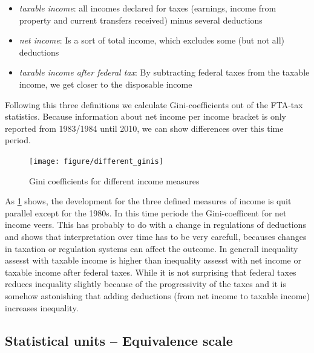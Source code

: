 \documentclass[twoside]{article}\usepackage[]{graphicx}\usepackage[]{color}
\newenvironment{knitrout}{}{} %
\begin{document}
\begin{multicols}{2}
\begin{itemize}
  \item \textit{taxable income}: all incomes declared for taxes (earnings, income from property and current transfers received) minus several deductions
  \item \textit{net income}: Is a sort of total income, which excludes some (but not all) deductions
  \item \textit{taxable income after federal tax}: By subtracting federal taxes from the taxable income, we get closer to the disposable income
\end{itemize}

Following this three definitions we calculate Gini-coefficients out of the FTA-tax statistics. Because information about net income per income bracket is only reported from 1983/1984 until 2010, we can show differences over this time period.



\begin{knitrout}
\color{fgcolor}\begin{figure}[H]

\texttt{[image: figure/different\_ginis]} \caption[Gini coefficients for different income measures]{Gini coefficients for different income measures\label{fig:different_ginis}}
\end{figure}


\end{knitrout}

As \ref{fig:different_ginis} shows, the development for the three defined measures of income is quit parallel except for the 1980s. In this time periode the Gini-coefficent for net income veers. This has probably to do with a change in regulations of deductions and shows that interpretation over time has to be very carefull, becauses changes in taxation or regulation systems can affect the outcome. In generall inequality assesst with taxable income is higher than inequality assesst with net income or taxable income after federal taxes. While it is not surprising that federal taxes reduces inequality slightly because of the progressivity of the taxes and it is somehow astonishing that adding deductions (from net income to taxable income) increases inequality.


\subsection{Statistical units -- Equivalence scale}


\end{multicols}
\end{document}
